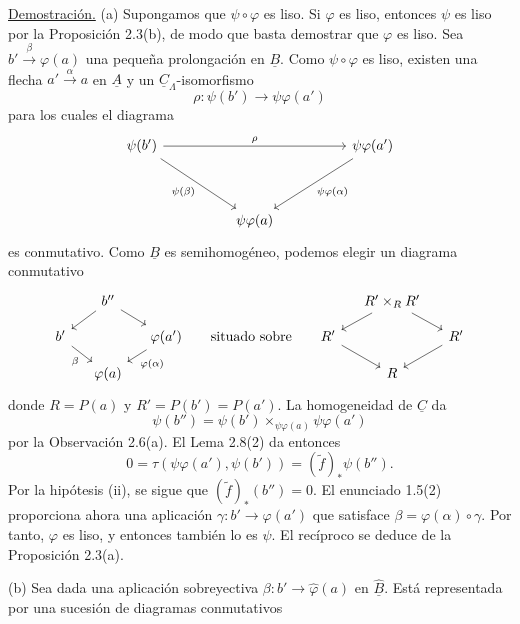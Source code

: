 \underline{Demostración.} (a) Supongamos que
$\psi\circ\varphi$ es liso. Si $\varphi$ es liso, entonces
$\psi$ es liso por la Proposición 2.3(b), de modo que basta
demostrar que $\varphi$ es liso. Sea
$b'\xrightarrow{\beta}\varphi(a)$ una pequeña prolongación en
$\underline B$. Como $\psi\circ\varphi$ es liso, existen una
flecha $a'\xrightarrow{\alpha}a$ en $\underline A$ y un
$\underline C_\Lambda$-isomorfismo
\[
 \rho:\psi(b')\longrightarrow\psi\varphi(a')
\]
para los cuales el diagrama
\[
\begin{tikzcd}[column sep=huge,row sep=huge]
 \psi(b') \arrow[rr,"{\rho}"] \arrow[dr,"{\psi(\beta)}"']
 && \psi\varphi(a') \arrow[dl,"{\psi\varphi(\alpha)}"]\\
 & \psi\varphi(a) &
\end{tikzcd}
\]
es conmutativo. Como $\underline B$ es semihomogéneo, podemos
elegir un diagrama conmutativo
\[
\begin{tikzcd}[column sep=small,row sep=small]
 & b'' \arrow[dl] \arrow[dr] &
 &&& R'\times_RR' \arrow[dl] \arrow[dr] &\\
 b' \arrow[dr,"{\beta}"'] &&
 \varphi(a') \arrow[dl,"{\varphi(\alpha)}"]
 & \text{situado sobre} &
 R' \arrow[dr] && R' \arrow[dl]\\
 & \varphi(a) &&&& R &
\end{tikzcd}
\]
donde $R=P(a)$ y $R'=P(b')=P(a')$. La homogeneidad de
$\underline C$ da
\[
 \psi(b'')=
 \psi(b')\times_{\psi\varphi(a)}\psi\varphi(a')
\]
por la Observación 2.6(a). El Lema 2.8(2) da entonces
\[
 0=\tau(\psi\varphi(a'),\psi(b'))
   =(\widetilde f)_*\psi(b'').
\]
Por la hipótesis (ii), se sigue que $(\widetilde f)_*(b'')=0$.
El enunciado 1.5(2) proporciona ahora una aplicación
$\gamma:b'\longrightarrow\varphi(a')$ que satisface
$\beta=\varphi(\alpha)\circ\gamma$. Por tanto, $\varphi$ es liso,
y entonces también lo es $\psi$. El recíproco se deduce de la
Proposición 2.3(a).

(b) Sea dada una aplicación sobreyectiva
$\beta:b'\longrightarrow\widehat\varphi(a)$ en
$\widehat{\underline B}$. Está representada por una sucesión de
diagramas conmutativos


